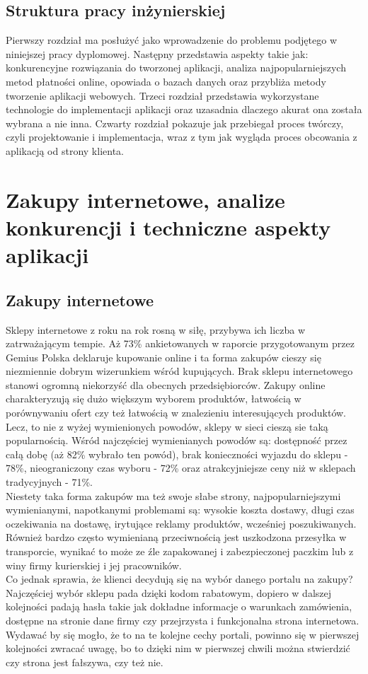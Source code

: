 \documentclass[12pt]{article}
\begin{document}
\begin{sloppypar}
{  \subsection{Struktura pracy inżynierskiej}
  {
    Pierwszy rozdział ma posłużyć jako wprowadzenie do problemu podjętego w niniejszej pracy dyplomowej.
    Następny przedstawia aspekty takie jak: konkurencyjne rozwiązania do tworzonej aplikacji,
    analiza najpopularniejszych metod płatności online, opowiada o bazach danych oraz przybliża
    metody tworzenie aplikacji webowych.
    Trzeci rozdział przedstawia wykorzystane technologie do implementacji aplikacji oraz uzasadnia dlaczego
    akurat ona została wybrana a nie inna.
    Czwarty rozdział pokazuje jak przebiegał proces twórczy, czyli projektowanie i implementacja, 
    wraz z tym jak wygląda proces obcowania z aplikacją od strony klienta.
  }
}

\section{Zakupy internetowe, analize konkurencji i techniczne aspekty aplikacji}
{
  \subsection{Zakupy internetowe}
  {
    Sklepy internetowe z roku na rok rosną w siłę, przybywa ich liczba w zatrważającym tempie. 
    Aż 73\% ankietowanych w raporcie przygotowanym przez Gemius Polska\cite{gemius-report} deklaruje kupowanie online i ta forma zakupów cieszy się niezmiennie dobrym 
    wizerunkiem wśród kupujących. Brak sklepu internetowego stanowi ogromną niekorzyść dla obecnych przedsiębiorców. 
    Zakupy online charakteryzują się dużo większym wyborem produktów, łatwością w porównywaniu ofert czy też łatwością w znalezieniu interesujących produktów. 
    Lecz, to nie z wyżej wymienionych powodów, sklepy w sieci cieszą sie taką popularnością.
    Wśród najczęściej wymienianych powodów są: dostępność przez całą dobę (aż 82\% wybrało ten powód), brak konieczności wyjazdu do sklepu - 78\%, 
    nieograniczony czas wyboru - 72\% oraz atrakcyjniejsze ceny niż w sklepach tradycyjnych - 71\%.\\
    Niestety taka forma zakupów ma też swoje słabe strony, najpopularniejszymi
    wymienianymi, napotkanymi problemami są: wysokie koszta dostawy, długi czas oczekiwania na dostawę, irytujące reklamy produktów, wcześniej poszukiwanych.
    Również bardzo często wymienianą przeciwnością jest uszkodzona przesyłka w transporcie, wynikać to może ze źle zapakowanej i zabezpieczonej paczkim lub z winy 
    firmy kurierskiej i jej pracowników.\\
    Co jednak sprawia, że klienci decydują się na wybór danego portalu na zakupy?\\
    Najczęściej wybór sklepu pada dzięki kodom rabatowym, dopiero w dalszej kolejności padają hasła takie jak dokładne informacje o warunkach zamówienia,
    dostępne na stronie dane firmy czy przejrzysta i funkcjonalna strona internetowa. Wydawać by się mogło, że to na te kolejne cechy portali, powinno się w pierwszej kolejności
    zwracać uwagę, bo to dzięki nim w pierwszej chwili można stwierdzić czy strona jest fałszywa, czy też nie.
    }
}
\end{sloppypar}
\end{document}
